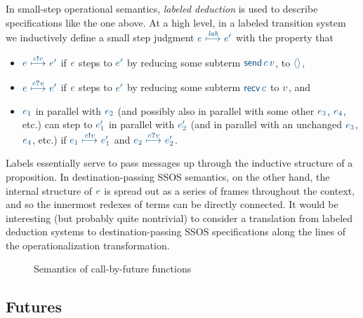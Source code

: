In small-step operational semantics, {\it labeled deduction} is used
to describe specifications like the one above. At a high level,
in a labeled transition system we
inductively define a small step judgment $\obj{e
  ~{\stackrel{\footnotesize{\it lab}}{\longmapsto}}~ e'}$ with the
property that \smallskip
\begin{itemize}
\item $\obj{e ~{\stackrel{\footnotesize{c{\textbf{!}}v}}{\longmapsto}}~
e'}$ if $\obj{e}$ steps to $\obj{e'}$ by reducing some subterm 
$\obj{{\sf send}\,c\,v}$,
to $\obj{\langle\rangle}$,
\item $\obj{e
~{\stackrel{\footnotesize{c{\textbf{?}}v}}{\longmapsto}}~ e'}$ if $\obj{e}$
steps to $\obj{e'}$ by reducing some subterm $\obj{{\sf recv}\,c}$ to 
$\obj{v}$, and 
\item $\obj{e_1}$ in parallel with $\obj{e_2}$ (and possibly also in
  parallel with some other $\obj{e_3}$, $\obj{e_4}$, etc.) can step to
  $\obj{e_1'}$ in parallel with $\obj{e_2'}$ (and in parallel with an
  unchanged $\obj{e_3}$, $\obj{e_4}$, etc.) if $\obj{e_1
    ~{\stackrel{\footnotesize{c{\textbf{!}}v}}{\longmapsto}}~ e_1'}$
  and $\obj{e_2
    ~{\stackrel{\footnotesize{c{\textbf{?}}v}}{\longmapsto}}~ e_2'}$.
\end{itemize}
\smallskip 
%
Labels essentially serve to pass messages up through the inductive
structure of a proposition.  In destination-passing SSOS semantics, on
the other hand, the internal structure of $\obj{e}$ is spread out as a
series of frames throughout the context, and so the innermost redexes
of terms can be directly connected. It would be interesting (but
probably quite nontrivial) to consider a translation from labeled
deduction systems to destination-passing SSOS specifications along the
lines of the operationalization transformation.


\begin{figure}
\caption{Semantics of call-by-future functions}
\label{fig:dest-futures}
\end{figure}

\subsection{Futures}
\label{sec:dest-futures}

